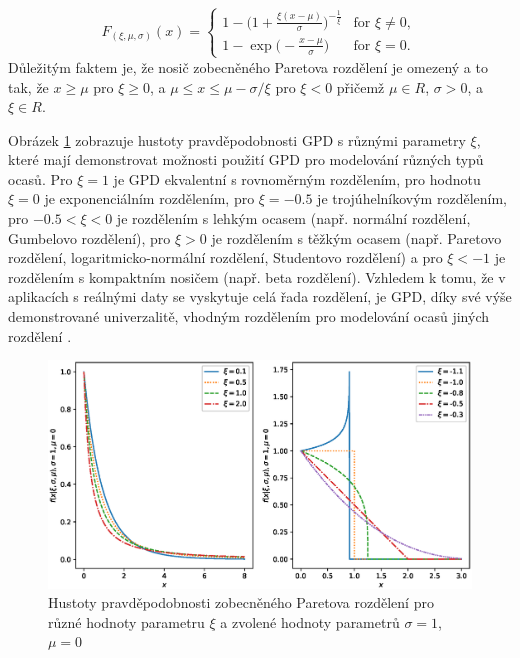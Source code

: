 \begin{equation}
  F_{(\xi,\mu,\sigma)}(x)=\begin{cases}
    1 - \Bigg(1+\frac{\xi(x-\mu)}{\sigma}\Bigg)^{-\frac{1}{\xi}} & \text{for $\xi \neq 0$},\\
    1 - \exp{\Big(-\frac{x-\mu}{\sigma} \Big)} & \text{for $\xi = 0$}.
  \end{cases}
\end{equation}
Důležitým faktem je, že nosič zobecněného Paretova rozdělení je omezený a to tak, že $x \geq \mu$ pro $\xi \geq 0$, a $\mu \leq x \leq \mu - \sigma/\xi$ pro $\xi < 0$ přičemž $\mu \in R$, $\sigma > 0$, a $\xi \in R$.
\par
Obrázek \ref{fig:gpd_pdfs} zobrazuje hustoty pravděpodobnosti GPD s různými parametry $\xi$, které mají demonstrovat možnosti použití GPD pro modelování různých typů ocasů. Pro $\xi=1$ je GPD ekvalentní s rovnoměrným rozdělením, pro hodnotu $\xi=0$ je exponenciálním rozdělením, pro $\xi=-0.5$ je trojúhelníkovým rozdělením, pro $-0.5 < \xi < 0$ je rozdělením s lehkým ocasem (např. normální rozdělení, Gumbelovo rozdělení), pro $\xi > 0$ je rozdělením s těžkým ocasem (např. Paretovo rozdělení, logaritmicko-normální rozdělení, Studentovo rozdělení) a pro $\xi < -1$ je rozdělením s kompaktním nosičem (např. beta rozdělení). Vzhledem k tomu, že v aplikacích s reálnými daty se vyskytuje celá řada rozdělení, je GPD, díky své výše demonstrované univerzalitě, vhodným rozdělením pro modelování ocasů jiných rozdělení \cite{gpd1,gpd2,gpd3}.

\begin{figure}
    \centering
    \includegraphics[scale=0.68]{IMG/MDPI/pdfs.eps}
    \caption{Hustoty pravděpodobnosti zobecněného Paretova rozdělení pro různé hodnoty parametru $\xi$ a zvolené hodnoty parametrů $\sigma=1$, $\mu=0$}
    \label{fig:gpd_pdfs}
\end{figure}

